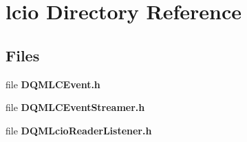 \section{lcio Directory Reference}
\label{dir_a4c8aa5e1ef86614bd5ac9171112ed5d}
\subsection*{Files}
\begin{DoxyCompactItemize}
\item 
file {\bf D\+Q\+M\+L\+C\+Event.\+h}
\item 
file {\bf D\+Q\+M\+L\+C\+Event\+Streamer.\+h}
\item 
file {\bf D\+Q\+M\+Lcio\+Reader\+Listener.\+h}
\end{DoxyCompactItemize}

